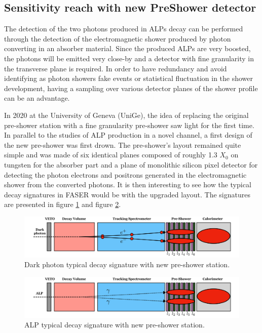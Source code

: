 		\subsection{Sensitivity reach with new PreShower detector}
		
		The detection of the two photons produced in ALPs decay can be performed through the detection of the electromagnetic shower produced by photon converting in an absorber material. Since the produced ALPs are very boosted, the photons will be emitted very close-by and a detector with fine granularity in the transverse plane is required. In order to have redundancy and avoid identifying as photon showers fake events or statistical fluctuation in the shower development, having a sampling over various detector planes of the shower profile can be an advantage. 
		
		In 2020 at the University of Geneva (UniGe), the idea of replacing the original pre-shower station with a fine granularity pre-shower saw light for the first time. In parallel to the studies of ALP production in a novel channel, a first design of the new pre-shower was first drown. The pre-shower's layout remained quite simple and was made of six identical planes composed of roughly 1.3 $X_0$ on tungsten for the absorber part and a plane of monolithic silicon pixel detector for detecting the photon electrons and positrons generated in the electromagnetic shower from the converted photons. It is then interesting to see how the typical decay signatures in FASER would be with the upgraded layout. The signatures are presented in figure \ref{im:FASER_DP_signature_newPS} and figure \ref{im:FASER_ALP_signature_newPS}. 
		
		\begin{figure}[h]
			\centering
			\includegraphics[width=1.0\linewidth]{files/FASER_DP_signature_newPS}
			\caption{Dark photon typical decay signature with new pre-shower station.}
			\label{im:FASER_DP_signature_newPS}
		\end{figure}
		
		\begin{figure}[h]
			\centering
			\includegraphics[width=1.0\linewidth]{files/FASER_ALP_signature_newPS}
			\caption{ALP typical decay signature with new pre-shower station.}
			\label{im:FASER_ALP_signature_newPS}
		\end{figure}
		
